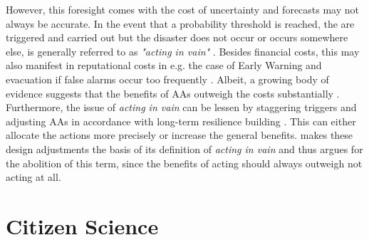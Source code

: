 However, this foresight comes with the cost of uncertainty and forecasts may not always be accurate. In the event that a probability threshold is reached, the  are triggered and carried out but the disaster does not occur or occurs somewhere else, is generally referred to as \textit{"acting in vain"} \autocite{coughlandeperezForecastbasedFinancingApproach2015}. Besides financial costs, this may also manifest in reputational costs in e.g. the case of Early Warning and evacuation if false alarms occur too frequently \autocite{elisabethstephensFORECASTBASEDACTION2015}. Albeit, a growing body of evidence suggests that the benefits of AAs outweigh the costs substantially \autocite{cabotventonEconomicsResilienceDrought2018,coughlandeperezForecastbasedFinancingApproach2015,gualazziniEWEAEarlyWarning2021}. Furthermore, the issue of \textit{acting in vain} can be lessen by staggering triggers and adjusting AAs in accordance with long-term resilience building \autocite{wfpMonitoringEvaluationAnticipatory2021}. This can either allocate the actions more precisely or increase the general benefits. \autocite{ifrcGlossaryTermsForecastbased2023} makes these design adjustments the basis of its definition of \textit{acting in vain} and thus argues for the abolition of this term, since the benefits of acting should always outweigh not acting at all.


\section{Citizen Science}\label{sec:cs}


